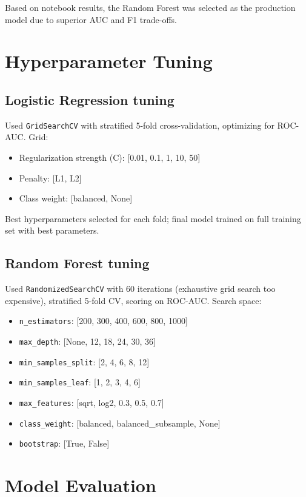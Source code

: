 Based on notebook results, the Random Forest was selected as the production model due to superior AUC and F1 trade-offs.

\section{Hyperparameter Tuning}
\label{sec:hyperparameter_tuning}

\subsection{Logistic Regression tuning}

Used \texttt{GridSearchCV} with stratified 5-fold cross-validation, optimizing for ROC-AUC. Grid:
\begin{itemize}
  \item Regularization strength (C): [0.01, 0.1, 1, 10, 50]
  \item Penalty: [L1, L2]
  \item Class weight: [balanced, None]
\end{itemize}

Best hyperparameters selected for each fold; final model trained on full training set with best parameters.

\subsection{Random Forest tuning}

Used \texttt{RandomizedSearchCV} with 60 iterations (exhaustive grid search too expensive), stratified 5-fold CV, scoring on ROC-AUC. Search space:
\begin{itemize}
  \item \texttt{n\_estimators}: [200, 300, 400, 600, 800, 1000]
  \item \texttt{max\_depth}: [None, 12, 18, 24, 30, 36]
  \item \texttt{min\_samples\_split}: [2, 4, 6, 8, 12]
  \item \texttt{min\_samples\_leaf}: [1, 2, 3, 4, 6]
  \item \texttt{max\_features}: [sqrt, log2, 0.3, 0.5, 0.7]
  \item \texttt{class\_weight}: [balanced, balanced\_subsample, None]
  \item \texttt{bootstrap}: [True, False]
\end{itemize}

\section{Model Evaluation}
\label{sec:model_evaluation}

